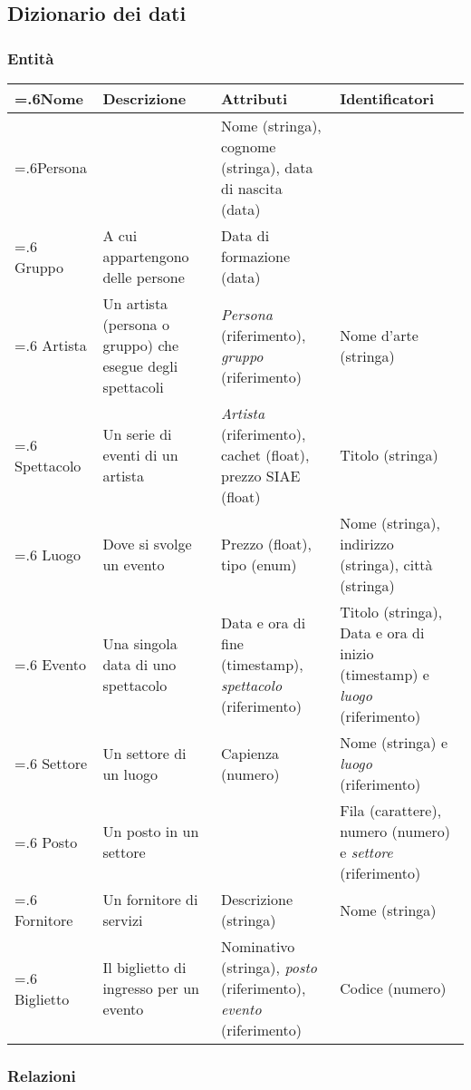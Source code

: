 \documentclass[a4paper,11pt]{article}
\begin{document}
\subsection{Dizionario dei dati}

\subsubsection*{Entità}

\begin{tabularx}{\textwidth}{|>{\hsize=.6\hsize}X|>{\raggedright\arraybackslash}X|>{\raggedright\arraybackslash\hsize=1.4\hsize}X|>{\raggedright\arraybackslash}X|}
\hline
\textbf{Nome} & \textbf{Descrizione} & \textbf{Attributi} & \textbf{Identificatori}\\
\hline
Persona & & Nome (stringa), cognome (stringa), data di nascita (data) &\\
\hline
Gruppo & A cui appartengono delle persone & Data di formazione (data) &\\
\hline
Artista & Un artista (persona o gruppo) che esegue degli spettacoli & \textit{Persona} (riferimento), \textit{gruppo} (riferimento) & Nome d'arte (stringa)\\
\hline
Spettacolo & Un serie di eventi di un artista & \textit{Artista} (riferimento), cachet (float), prezzo SIAE (float) & Titolo (stringa)\\
\hline
Luogo & Dove si svolge un evento & Prezzo (float), tipo (enum) & Nome (stringa), indirizzo (stringa), città (stringa)\\
\hline
Evento & Una singola data di uno spettacolo & Data e ora di fine (timestamp), \textit{spettacolo} (riferimento) & Titolo (stringa), Data e ora di inizio (timestamp) e \textit{luogo} (riferimento)\\
\hline
Settore & Un settore di un luogo & Capienza (numero) & Nome (stringa) e \textit{luogo} (riferimento)\\
\hline
Posto & Un posto in un settore & & Fila (carattere), numero (numero) e \textit{settore} (riferimento)\\
\hline
Fornitore & Un fornitore di servizi & Descrizione (stringa) & Nome (stringa)\\
\hline
Biglietto & Il biglietto di ingresso per un evento & Nominativo (stringa), \textit{posto} (riferimento), \textit{evento} (riferimento) & Codice (numero)\\
\hline
\end{tabularx}

\subsubsection*{Relazioni}
\end{document}
